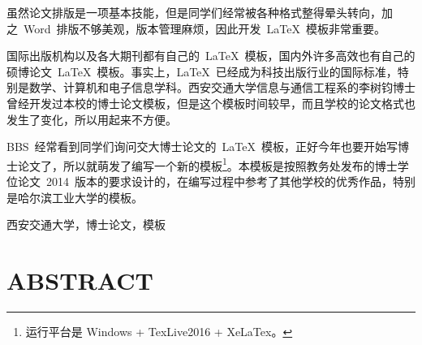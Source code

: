 
\titlespacing{\chapter}{0pt}{3mm}{6mm}

\setcounter{page}{1}


虽然论文排版是一项基本技能，但是同学们经常被各种格式整得晕头转向，加之~Word~排版不够美观，版本管理麻烦，因此开发~\LaTeX~模板非常重要。

国际出版机构以及各大期刊都有自己的~\LaTeX~模板，国内外许多高效也有自己的硕博论文~\LaTeX~模板。事实上，\LaTeX~已经成为科技出版行业的国际标准，特别是数学、计算机和电子信息学科。西安交通大学信息与通信工程系的李树钧博士曾经开发过本校的博士论文模板，但是这个模板时间较早，而且学校的论文格式也发生了变化，所以用起来不方便。

BBS~经常看到同学们询问交大博士论文的~\LaTeX~模板，正好今年也要开始写博士论文了，所以就萌发了编写一个新的模板\footnote{运行平台是 \color{red}Windows + TexLive2016 + XeLaTex。}。本模板是按照教务处发布的博士学位论文~2014~版本的要求设计的，在编写过程中参考了其他学校的优秀作品，特别是哈尔滨工业大学的模板。

\vspace{\baselineskip}
 西安交通大学，博士论文，模板

\vspace{\baselineskip}
\clearpage

\titlespacing{\chapter}{0pt}{3mm}{5mm}
\chapter*{ABSTRACT}
{}

